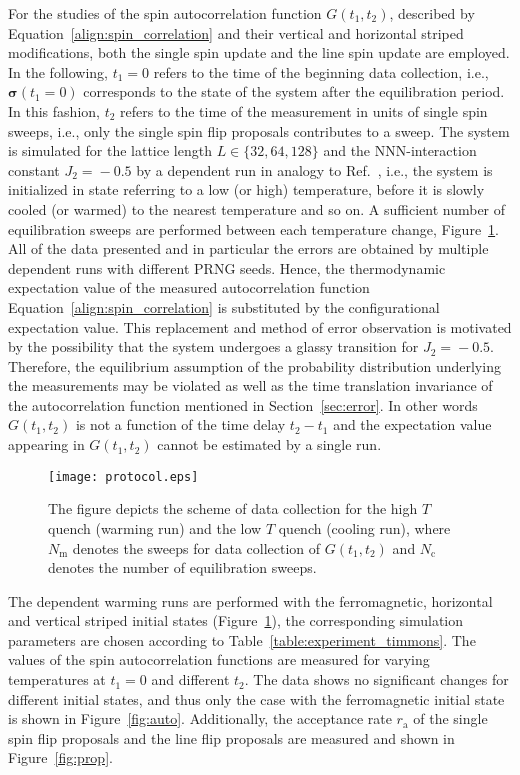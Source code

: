 For the studies of the spin autocorrelation function $G(t_1,t_2)$, described by Equation~\eqref{align:spin_correlation} and their vertical and 
horizontal striped modifications, both the single spin update and the line spin update are employed. In the following, 
$t_1\!=\!0$ refers to the time of the beginning data collection, i.e., $\bm{\sigma}(t_1\!=\!0)$ corresponds to the state of the system after the 
equilibration period. In this fashion, $t_2$ refers to the time of the measurement in units of single spin sweeps, i.e., only the single spin flip proposals 
contributes to a sweep. The system is simulated for the lattice length $L\!\in\!\{32,64,128\}$ and the NNN-interaction constant 
$J_2\!=\!-0.5$ by a dependent run in analogy to Ref.~\cite{Timmons2018}, i.e., the system is initialized in state 
referring to a low (or high) temperature, before it is slowly cooled (or warmed) to the nearest temperature and so on. A sufficient 
number of equilibration sweeps are performed between each temperature change, Figure~\ref{fig:protocol}. All of the data presented and in particular the errors are obtained by multiple
dependent runs with different PRNG seeds. Hence, the thermodynamic expectation value of the measured autocorrelation function Equation~\eqref{align:spin_correlation}
is substituted by the configurational expectation value. This replacement and method of error observation is motivated by the possibility that the 
system undergoes a glassy transition for $J_2\!=\!-0.5$. Therefore, the equilibrium assumption of the probability distribution underlying
the measurements  may be violated as well as the time translation invariance of the autocorrelation function mentioned in Section~\ref{sec:error}. In other
words $G(t_1,t_2)$ is not a function of the time delay $t_2\!-\!t_1$ and the expectation value appearing in $G(t_1,t_2)$ cannot be estimated by a single
run. 

\begin{figure}[!h]
  \texttt{[image: protocol.eps]}
  \caption{The figure depicts the scheme of data collection for the high $T$ quench (warming run) and the low $T$ quench (cooling run), 
           where $N_\mathrm{m}$ denotes the sweeps for data collection of $G(t_1,t_2)$ and $N_\mathrm{c}$ denotes the number of equilibration sweeps.}
  \label{fig:protocol}
\end{figure}

The dependent warming runs are performed with the ferromagnetic, horizontal and vertical striped initial states (Figure~\ref{fig:protocol}), the corresponding simulation parameters are 
chosen according to Table~\ref{table:experiment_timmons}. The values of the spin autocorrelation functions are measured for varying temperatures at $t_1\!=\!0$ 
and different $t_2$. The data shows no significant changes for different initial states, and thus only the case with the ferromagnetic initial state is shown in 
Figure~\ref{fig:auto}. Additionally, the acceptance rate $r_\mathrm{a}$ of the single spin flip proposals and the line flip proposals are measured and
shown in Figure~\ref{fig:prop}.
 
